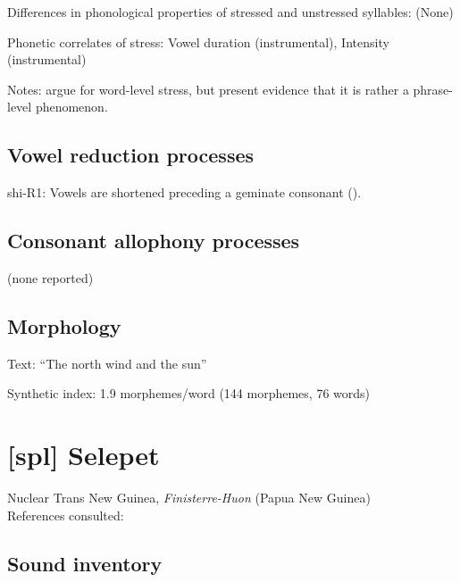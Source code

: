 {\begin{appendixdesc}
\item[Differences in phonological properties of stressed and unstressed syllables:] (None)

\item[Phonetic correlates of stress:] Vowel duration (instrumental), Intensity (instrumental)

\item[Notes:] \citet{GordonNafi2012} argue for word-level stress, but \citet{RoettgerEtAl2015} present evidence that it is rather a phrase-level phenomenon.
\end{appendixdesc}
\subsection*{Vowel reduction processes}
\begin{appendixdesc}

\item[shi-R1:] Vowels are shortened preceding a geminate consonant (\citealt{DellElmedlaoui2002}).
\end{appendixdesc}
\subsection*{Consonant allophony processes}

(none reported)

\subsection*{Morphology}
\begin{appendixdesc}
\item[Text:] “The north wind and the sun” \citep[219]{Ridouane2014}

\item[Synthetic index:] 1.9 morphemes/word (144 morphemes, 76 words)
\end{appendixdesc}

\section*{[spl] Selepet}  %
Nuclear Trans New Guinea, \textit{Finisterre-Huon} (Papua New Guinea)\medskip\\
References consulted: \citet{McElhanon1970}

\subsection*{Sound inventory}
\begin{appendixdesc}


\end{appendixdesc}}

